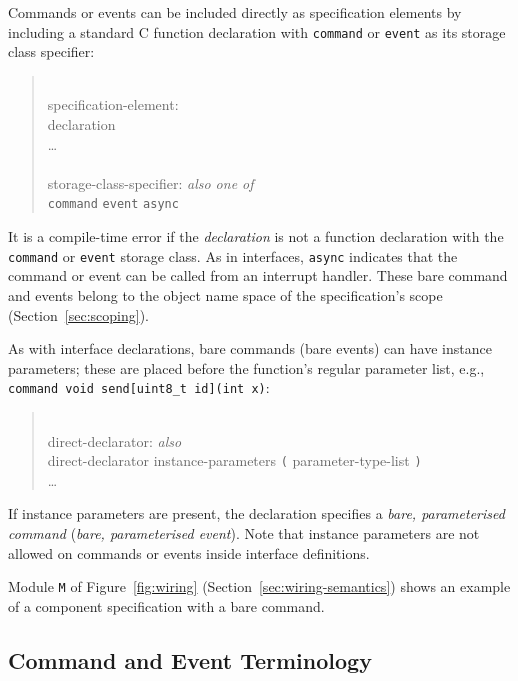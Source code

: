 \documentclass[11pt,letterpaper]{article}
\newcommand{\kw}[1]{{\tt #1}}
\newcommand{\code}[1]{{\tt #1}}
\newcommand{\grammarshift}{\vspace*{-.7cm}}
\newcommand{\grammarindent}{\hspace*{2cm}\= \\ \kill}
\begin{document}
Commands or events can be included directly as specification elements by
including a standard C function declaration with
\kw{command} or \kw{event} as its storage class specifier:
\begin{quote} \grammarshift \em \begin{tabbing}
\grammarindent
specification-element:\\
\>	declaration\\
\>	\ldots\\
\\
storage-class-specifier: \emph{also one of}\\
\>	\kw{command} \kw{event} \kw{async}\\
\end{tabbing} \end{quote}
It is a compile-time error if the \emph{declaration} is not a function
declaration with the \kw{command} or \kw{event} storage class. As in
interfaces, \kw{async} indicates that the command or event can be called
from an interrupt handler. These bare command and events belong to the
object name space of the specification's scope (Section~\ref{sec:scoping}).

As with interface declarations, bare commands (bare events) can have instance
parameters; these are placed before
the function's regular parameter list, e.g., \code{command void
send[uint8\_t id](int x)}: 
\begin{quote} \grammarshift \em \begin{tabbing}
\grammarindent
direct-declarator: \emph{also}\\
\>	direct-declarator instance-parameters \kw{(} parameter-type-list \kw{)}\\
\>	\ldots
\end{tabbing} \end{quote}

If instance parameters are present, the declaration specifies a \emph{bare,
parameterised command} (\emph{bare, parameterised event}). Note that
instance parameters are not allowed on commands or events inside interface
definitions.

Module \code{M} of Figure~\ref{fig:wiring}
(Section~\ref{sec:wiring-semantics}) shows an example of a component
specification with a bare command.

\subsection{Command and Event Terminology}
\end{document}
